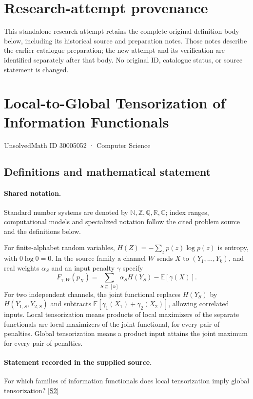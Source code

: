 \documentclass[11pt]{article}
\begin{document}
\section*{Research-attempt provenance}
This standalone research attempt retains the complete original definition body below,
including its historical source and preparation notes. Those notes describe the
earlier catalogue preparation; the new attempt and its verification are identified
separately after that body. No original ID, catalogue status, or source statement is changed.

\section{Local-to-Global Tensorization of Information Functionals}\label{30005052}
{\small UnsolvedMath ID 30005052 · Computer Science}
\subsection{Definitions and mathematical statement}

\paragraph{Shared notation.}Standard number systems are denoted by $\mathbb N,\mathbb Z,\mathbb Q,\mathbb R,\mathbb C$; index ranges, computational models and specialized notation follow the cited problem source and the definitions below.


For finite-alphabet random variables, $H(Z)=-\sum_z p(z)\log p(z)$ is entropy, with $0\log0=0$. In the source family a channel $W$ sends $X$ to $(Y_1,\ldots,Y_k)$, and real weights $\alpha_S$ and an input penalty $\gamma$ specify
\[F_{\gamma,W}(p_X)=\sum_{S\subseteq[k]}\alpha_S H(Y_S)-\mathbb E[\gamma(X)].\]
For two independent channels, the joint functional replaces $H(Y_S)$ by $H(Y_{1,S},Y_{2,S})$ and subtracts $\mathbb E[\gamma_1(X_1)+\gamma_2(X_2)]$, allowing correlated inputs. Local tensorization means products of local maximizers of the separate functionals are local maximizers of the joint functional, for every pair of penalties. Global tensorization means a product input attains the joint maximum for every pair of penalties.
\paragraph{Statement recorded in the supplied source.}
For which families of information functionals does local tensorization imply global tensorization? \href{https://doi.org/10.4171/owr/2022/14}{[S2]}
\end{document}
